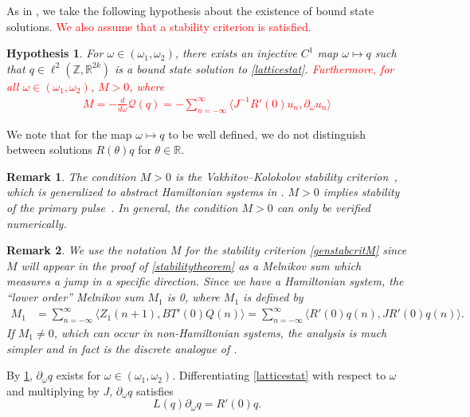 \documentclass[12pt]{elsarticle}
\def\R{{\mathbb R}}
\def\Z{{\mathbb Z}}
\newtheorem{hypothesis}{Hypothesis}
\newtheorem{remark}{Remark}
\newcommand{\revised}[1]{ \textcolor{red}{#1} }
\begin{document}
As in \cite[Assumption 2]{Grillakis1987}, we take the following hypothesis about the existence of bound state solutions. \revised{We also assume that a stability criterion is satisfied.}
\begin{hypothesis}\label{boundstatehyp}
For $\omega \in (\omega_1, \omega_2)$, there exists an injective $C^1$ map $\omega \mapsto q$ such that $q \in \ell^2(\Z, \R^{2k})$ is a bound state solution to \cref{latticestat}. \revised{ Furthermore, for all $\omega \in (\omega_1, \omega_2)$, $M > 0$, where
\begin{align}\label{genstabcritM}
M = -\frac{d}{d\omega} \mathcal{Q}(q) = -\sum_{n = -\infty}^\infty 
\langle J^{-1}R'(0) u_n, \partial_\omega u_n \rangle
\end{align}
}
\end{hypothesis}
We note that for the map $\omega \mapsto q$ to be well defined, we do not distinguish between solutions $R(\theta)q$ for $\theta \in \R$.

\begin{remark}
The condition $M > 0$ is the Vakhitov–Kolokolov stability criterion~\cite{Vakhitov1973}, which is generalized to abstract Hamiltonian systems in \cite{Grillakis1987}. $M > 0$ implies stability of the primary pulse~\cite{Grillakis1987}. In general, the condition $M > 0$ can only be verified numerically.
\end{remark}

\begin{remark}
We use the notation $M$ for the stability criterion \eqref{genstabcritM} since $M$ will appear in the proof of \cref{stabilitytheorem} as a Melnikov sum which measures a jump in a specific direction. Since we have a Hamiltonian system, the ``lower order'' Melnikov sum $M_1$ is 0, where $M_1$ is defined by
\begin{align}\label{MelnikovM1zero}
M_1 &= \sum_{n=-\infty}^\infty \langle Z_1(n+1), B T'(0)Q(n) \rangle
= \sum_{n=-\infty}^\infty \langle R'(0)q(n), J R'(0)q(n) \rangle.
\end{align}
If $M_1 \neq 0$, which can occur in non-Hamiltonian systems, the analysis is much simpler and in fact is the discrete analogue of \cite{Sandstede1998}. 
\end{remark}

By \cref{boundstatehyp}, $\partial_\omega q$ exists for $\omega \in (\omega_1, \omega_2)$. Differentiating \cref{latticestat} with respect to $\omega$ and multiplying by $J$, $\partial_\omega q$ satisfies 
\begin{equation}\label{Lkernel2}
L(q)\partial_\omega q = R'(0) q.
\end{equation}
\end{document}
